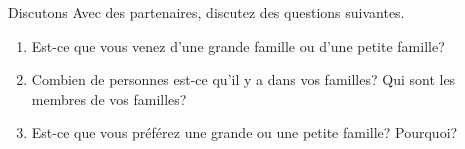 \begin{frame}{Discutons}
  Avec des partenaires, discutez des questions suivantes.
  \begin{enumerate}
    \item Est-ce que vous venez d'une grande famille ou d'une petite famille? 
    \item Combien de personnes est-ce qu'il y a dans vos familles? Qui sont les membres de vos familles?
    \item Est-ce que vous préférez une grande ou une petite famille? Pourquoi?
  \end{enumerate}
\end{frame}